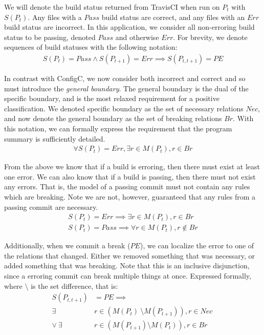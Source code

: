 We will denote the build status returned from TravisCI when run on $P_t$ with $S(P_t)$.
Any files with a $Pass$ build status are correct, and any files with an $Err$ build status are incorrect.
In this application, we consider all non-erroring build status to be passing, denoted $Pass$ and otherwise $Err$.
For brevity, we denote sequences of build statuses with the following notation:
\begin{align*}
  S(P_t)=Pass \land S(P_{t+1})=Err \implies S(P_{t,t+1}) = PE
\end{align*}

In contrast with ConfigC, we now consider both incorrect and correct and so must introduce the \textit{general boundary}.
The general boundary is the dual of the specific boundary, and is the most relaxed requirement for a positive classification.
We denoted specific boundary as the set of necessary relations $Nec$, and now denote the general boundary as the set of breaking relations $Br$.
With this notation, we can formally express the requirement that the program summary is sufficiently detailed.
\begin{align}
  \forall S(P_t)=Err, \exists r \in M(P_t), r \in Br \label{eq:E1}
\end{align}

From the above we know that if a build is erroring, then there must exist at least one error.
We can also know that if a build is passing, then there must not exist any errors.
That is, the model of a passing commit must not contain any rules which are breaking.
Note we are not, however, guaranteed that any rules from a passing commit are necessary.
\begin{align}
  S(P_t) = Err \implies \exists r \in  M (P_t), r \in Br \label{eq:E}\\
  S(P_t) = Pass \implies \forall r \in  M (P_t), r \notin Br \label{eq:P}
\end{align}

Additionally, when we commit a break ($PE$), we can localize the error to one of the relations that changed.
Either we removed something that was necessary, or added something that was breaking.
Note that this is an inclusive disjunction, since a erroring commit can break multiple things at once.
Expressed formally, where $\setminus$ is the set difference, that is:
\begin{align}
  S(P_{t,t+1}) &= PE \implies \nonumber \\
  \exists& r \in (M(P_{t})\ \setminus M(P_{t+1})), r \in Nec\ \nonumber \\
  \lor \ \exists& r \in (M(P_{t+1}) \setminus M(P_{t})), r \in Br \label{eq:PE}
\end{align}

